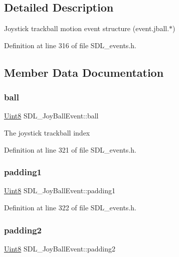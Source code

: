\subsection{Detailed Description}
Joystick trackball motion event structure (event.\+jball.$\ast$) 

Definition at line 316 of file S\+D\+L\+\_\+events.\+h.



\subsection{Member Data Documentation}
\mbox{\label{struct_s_d_l___joy_ball_event_add4eb0daeaf95ae56e8c7cfcec560242}} 
\subsubsection{\texorpdfstring{ball}{ball}}
{\footnotesize\ttfamily \mbox{\hyperlink{_s_d_l__stdinc_8h_a2944638813a090aa23e62f4da842c3e2}{Uint8}} S\+D\+L\+\_\+\+Joy\+Ball\+Event\+::ball}

The joystick trackball index 

Definition at line 321 of file S\+D\+L\+\_\+events.\+h.

\mbox{\label{struct_s_d_l___joy_ball_event_aff75a6519ca2a19cffdc14ebf4626613}} 
\subsubsection{\texorpdfstring{padding1}{padding1}}
{\footnotesize\ttfamily \mbox{\hyperlink{_s_d_l__stdinc_8h_a2944638813a090aa23e62f4da842c3e2}{Uint8}} S\+D\+L\+\_\+\+Joy\+Ball\+Event\+::padding1}



Definition at line 322 of file S\+D\+L\+\_\+events.\+h.

\mbox{\label{struct_s_d_l___joy_ball_event_a0ea3071b99ac096b0157714f01ff04f8}} 
\subsubsection{\texorpdfstring{padding2}{padding2}}
{\footnotesize\ttfamily \mbox{\hyperlink{_s_d_l__stdinc_8h_a2944638813a090aa23e62f4da842c3e2}{Uint8}} S\+D\+L\+\_\+\+Joy\+Ball\+Event\+::padding2}



